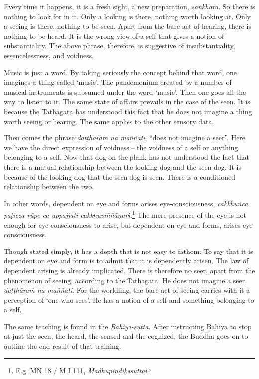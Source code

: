 Every time it happens, it is a fresh sight, a new preparation, \emph{saṅkhāra}. So there is nothing to look for in it. Only a looking is there, nothing worth looking at. Only a seeing is there, nothing to be seen. Apart from the bare act of hearing, there is nothing to be heard. It is the wrong view of a self that gives a notion of substantiality. The above phrase, therefore, is suggestive of insubstantiality, essencelessness, and voidness.

Music is just a word. By taking seriously the concept behind that word, one imagines a thing called `music'. The pandemonium created by a number of musical instruments is subsumed under the word `music'. Then one goes all the way to listen to it. The same state of affairs prevails in the case of the seen. It is because the Tathāgata has understood this fact that he does not imagine a thing worth seeing or hearing. The same applies to the other sensory data.

Then comes the phrase \emph{daṭṭhāraṁ na maññati}, ``does not imagine a seer''. Here we have the direct expression of voidness -- the voidness of a self or anything belonging to a self. Now that dog on the plank has not understood the fact that there is a mutual relationship between the looking dog and the seen dog. It is because of the looking dog that the seen dog is seen. There is a conditioned relationship between the two.

In other words, dependent on eye and forms arises eye-consciousness, \emph{cakkhuñca paṭicca rūpe ca uppajjati cakkhuviññāṇaṁ}.\footnote{E.g. \href{https://suttacentral.net/mn18/pli/ms}{MN 18 / M I 111}, \emph{Madhupiṇḍikasutta}} The mere presence of the eye is not enough for eye consciousness to arise, but dependent on eye and forms, arises eye-consciousness.

Though stated simply, it has a depth that is not easy to fathom. To say that it is dependent on eye and form is to admit that it is dependently arisen. The law of dependent arising is already implicated. There is therefore no seer, apart from the phenomenon of seeing, according to the Tathāgata. He does not imagine a seer, \emph{daṭṭhāraṁ na maññati}. For the worldling, the bare act of seeing carries with it a perception of `one who sees'. He has a notion of a self and something belonging to a self.

The same teaching is found in the \emph{Bāhiya-sutta}. After instructing Bāhiya to stop at just the seen, the heard, the sensed and the cognized, the Buddha goes on to outline the end result of that training.

